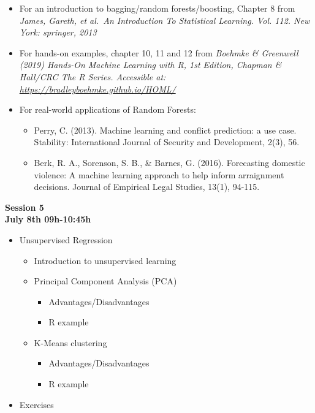 \documentclass[
]{book}
\providecommand{\tightlist}{%
  \setlength{\itemsep}{0pt}\setlength{\parskip}{0pt}}
\begin{document}
\begin{itemize}
\item
  For an introduction to bagging/random forests/boosting, Chapter 8 from \emph{James, Gareth, et al.~An Introduction To Statistical Learning. Vol. 112. New York: springer, 2013}
\item
  For hands-on examples, chapter 10, 11 and 12 from \emph{Boehmke \& Greenwell (2019) Hands-On Machine Learning with R, 1st Edition, Chapman \& Hall/CRC The R Series. Accessible at: \url{https://bradleyboehmke.github.io/HOML/}}
\item
  For real-world applications of Random Forests:

  \begin{itemize}
  \item
    Perry, C. (2013). Machine learning and conflict prediction: a use case. Stability: International Journal of Security and Development, 2(3), 56.
  \item
    Berk, R. A., Sorenson, S. B., \& Barnes, G. (2016). Forecasting domestic violence: A machine learning approach to help inform arraignment decisions. Journal of Empirical Legal Studies, 13(1), 94-115.
  \end{itemize}
\end{itemize}

\textbf{Session 5}\\
\textbf{July 8th 09h-10:45h}

\begin{itemize}
\tightlist
\item
  Unsupervised Regression

  \begin{itemize}
  \tightlist
  \item
    Introduction to unsupervised learning
  \item
    Principal Component Analysis (PCA)

    \begin{itemize}
    \tightlist
    \item
      Advantages/Disadvantages
    \item
      R example
    \end{itemize}
  \item
    K-Means clustering

    \begin{itemize}
    \tightlist
    \item
      Advantages/Disadvantages
    \item
      R example
    \end{itemize}
  \end{itemize}
\item
  Exercises
\end{itemize}
\end{document}
